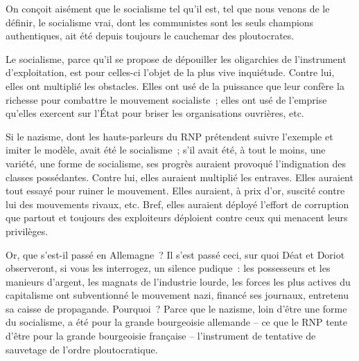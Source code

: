 \documentclass[french,twoside]{book} %
\newcommand\chaptercont{} %
\begin{document}
\chaptercont
\noindent On conçoit aisément que le socialisme tel qu’il est, tel que nous venons de le définir, le socialisme vrai, dont les communistes sont les seuls champions authentiques, ait été depuis toujours le cauchemar des ploutocrates.\par
Le socialisme, parce qu’il se propose de dépouiller les oligarchies de l’instrument d’exploitation, est pour celles-ci l’objet de la plus vive inquiétude. Contre lui, elles ont multiplié les obstacles. Elles ont usé de la puissance que leur confère la richesse pour combattre le mouvement socialiste ; elles ont usé de l’emprise qu’elles exercent sur l’État pour briser les organisations ouvrières, etc.\par
Si le nazisme, dont les hauts-parleurs du RNP prétendent suivre l’exemple et imiter le modèle, avait été le socialisme ; s’il avait été, à tout le moins, une variété, une forme de socialisme, ses progrès auraient provoqué l’indignation des classes possédantes. Contre lui, elles auraient multiplié les entraves. Elles auraient tout essayé pour ruiner le mouvement. Elles auraient, à prix d’or, suscité contre lui des mouvements rivaux, etc. Bref, elles auraient déployé l’effort de corruption que partout et toujours des exploiteurs déploient contre ceux qui menacent leurs privilèges.\par
Or, que s’est-il passé en Allemagne ? Il s’est passé ceci, sur quoi Déat et Doriot observeront, si vous les interrogez, un silence pudique : les possesseurs et les manieurs d’argent, les magnats de l’industrie lourde, les forces les plus actives du capitalisme ont subventionné le mouvement nazi, financé ses journaux, entretenu sa caisse de propagande. Pourquoi ? Parce que le nazisme, loin d’être une forme du socialisme, a été pour la grande bourgeoisie allemande – ce que le RNP tente d’être pour la grande bourgeoisie française – l’instrument de tentative de sauvetage de l’ordre ploutocratique.\par
\end{document}
